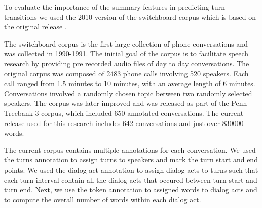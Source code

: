 To evaluate the importance of the summary features in predicting turn transitions we used the 2010 version of the switchboard corpus \cite{calhoun2010nxt} which is based on the original release \cite{225858}.

The switchboard corpus is the first large collection of phone conversations and was collected in 1990-1991. The initial goal of the corpus is to facilitate speech research by providing pre recorded audio files of day to day conversations. The original corpus was composed of 2483 phone calls involving 520 speakers. Each call ranged from 1.5 minutes to 10 minutes, with an average length of 6 minutes. Conversations involved a randomly chosen topic between two randomly selected speakers. The corpus was later improved and was released as part of the Penn Treebank 3 corpus, which included 650 annotated conversations. The current release used for this research includes 642 conversations and just over 830000 words.

The current corpus contains multiple annotations for each conversation. We used the turns annotation to assign turns to speakers and mark the turn start and end points. We used the dialog act annotation to assign dialog acts to turns such that each turn interval contain all the dialog acts that occured between turn start and turn end. Next, we use the token annotation to assigned words to dialog acts and to compute the overall number of words within each dialog act.
